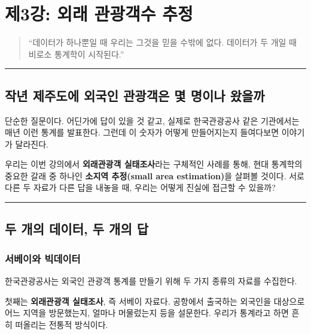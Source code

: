 \documentclass[
  letterpaper,
  DIV=11,
  numbers=noendperiod]{scrreprt}
\begin{document}
\chapter{제3강: 외래 관광객수
추정}\label{uxc81c3uxac15-uxc678uxb798-uxad00uxad11uxac1duxc218-uxcd94uxc815}

\begin{quote}
``데이터가 하나뿐일 때 우리는 그것을 믿을 수밖에 없다. 데이터가 두 개일
때 비로소 통계학이 시작된다.''
\end{quote}

\begin{center}\rule{0.5\linewidth}{0.5pt}\end{center}

\section{작년 제주도에 외국인 관광객은 몇 명이나
왔을까}\label{uxc791uxb144-uxc81cuxc8fcuxb3c4uxc5d0-uxc678uxad6duxc778-uxad00uxad11uxac1duxc740-uxba87-uxba85uxc774uxb098-uxc654uxc744uxae4c}

단순한 질문이다. 어딘가에 답이 있을 것 같고, 실제로 한국관광공사 같은
기관에서는 매년 이런 통계를 발표한다. 그런데 이 숫자가 어떻게
만들어지는지 들여다보면 이야기가 달라진다.

우리는 이번 강의에서 \textbf{외래관광객 실태조사}라는 구체적인 사례를
통해, 현대 통계학의 중요한 갈래 중 하나인 \textbf{소지역 추정(small area
estimation)}을 살펴볼 것이다. 서로 다른 두 자료가 다른 답을 내놓을 때,
우리는 어떻게 진실에 접근할 수 있을까?

\begin{center}\rule{0.5\linewidth}{0.5pt}\end{center}

\section{두 개의 데이터, 두 개의
답}\label{uxb450-uxac1cuxc758-uxb370uxc774uxd130-uxb450-uxac1cuxc758-uxb2f5}

\subsection{서베이와
빅데이터}\label{uxc11cuxbca0uxc774uxc640-uxbe45uxb370uxc774uxd130}

한국관광공사는 외국인 관광객 통계를 만들기 위해 두 가지 종류의 자료를
수집한다.

첫째는 \textbf{외래관광객 실태조사}, 즉 서베이 자료다. 공항에서 출국하는
외국인을 대상으로 어느 지역을 방문했는지, 얼마나 머물렀는지 등을
설문한다. 우리가 통계라고 하면 흔히 떠올리는 전통적 방식이다.
\end{document}
